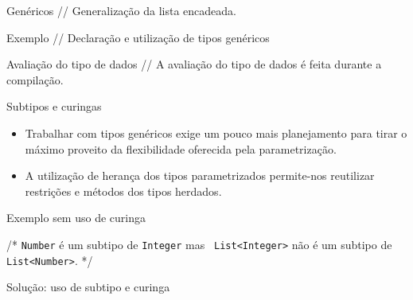 \begin{frame}[fragile]{Genéricos}{}
  {// Generalização da lista encadeada.}
  
\end{frame}

\begin{frame}[fragile]{Exemplo}{}
  {\small // Declaração e utilização de tipos genéricos}
  
\end{frame}

\begin{frame}[fragile]{Avaliação do tipo de dados}{}
  {\small // A avaliação do tipo de dados é feita durante a compilação.}
  
\end{frame}

\begin{frame}{Subtipos e curingas}{}
  \begin{itemize}
  \item Trabalhar com tipos genéricos exige um pouco mais planejamento
    para tirar o máximo proveito da flexibilidade oferecida pela parametrização.
  \item A utilização de herança dos tipos parametrizados permite-nos
    reutilizar restrições e métodos dos tipos herdados.
  \end{itemize}

\end{frame}

\begin{frame}[fragile]{Exemplo sem uso de curinga}{}
  
  {/* \small {\tt Number} é um subtipo de {\tt Integer} mas {\tt
      List<Integer>} \alert{não} é um subtipo de {\tt List<Number>}. */}
  
\end{frame}

\begin{frame}[fragile]{Solução: uso de subtipo e curinga}{}
  
  
\end{frame}

